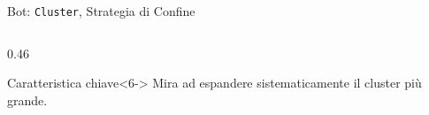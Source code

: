 \documentclass[9pt,serif,usenames,dvipsnames]{beamer}
\begin{document}
\begin{frame}{\centering Bot: \texttt{Cluster}, Strategia di Confine}
\begin{columns}[T]
\begin{column}{0.46\textwidth}
\begin{center}
				\end{center}
				\begin{alertblock}{Caratteristica chiave}<6->
					\small
					Mira ad \alert{espandere}
					sistematicamente il cluster più grande.
				\end{alertblock}
			\end{column}
		\end{columns}
	\end{frame}
\end{document}

